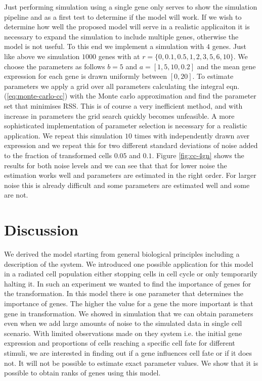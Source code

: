 Just performing simulation using a single gene only serves to show the simulation pipeline and as a first test to determine if the model will work. If we wish to determine how well the proposed model will serve in a realistic applicaiton it is necessary to expand the simulation to include multiple genes, otherwise the model is not useful. To this end we implement a simulation with $4$ genes. Just like above we simulation $1000$ genes with at $r =\lbrace 0, 0.1, 0.5, 1, 2, 3, 5, 6, 10 \rbrace$. We choose the parameters as follows $b=5$ and $a=[1, 5, 10, 0.2]$ and the mean gene expression for each gene is drawn uniformly between $[0, 20]$. To estimate parameters we apply a grid over all parameters calculating the integral eqn. (\ref{eq:monte-carlo-cc}) with the Monte carlo approximation and find the parameter set that minimises RSS. This is of course a very inefficient  method,  and with increase in parameters the grid search quickly becomes unfeasible. A more sophisticated implementation of parameter selection is necessary for a realistic application.  We repeat this simulation $10$ times with independently drawn aver expression and we repeat this for two different standard deviations of noise added to the fraction of transformed cells $0.05$ and $0.1$. Figure \ref{fig:cc-4gn} shows the results for both noise levels and we can see that that for lower noise the estimation works well and parameters are estimated in the right order. For larger noise this is already difficult and some parameters are estimated well and some are not. 



\section{Discussion}
\label{sec:discussion-cc}

We derived the model starting from general biological principles including a description of the system. We introduced one possible application for this model in a radiated cell population either stopping cells in cell cycle or only temporarily halting it. In such an experiment we wanted to find the importance of genes for the transformation.  In this model there is one parameter that determines the importance of genes. The higher the value for a gene the more important is that gene in transformation. We showed in simulation that we can obtain parameters even when we add large amounts of noise to the simulated data in single cell scenario. With limited observations made on they system i.e. the initial gene expression and proportions of cells reaching a specific cell fate for different stimuli, we are interested in finding out if a gene influences cell fate or if it does not. It will not be possible to estimate exact parameter values. We show that it is possible to obtain ranks of genes using this model.

